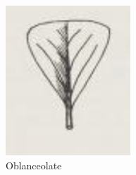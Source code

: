 \documentclass[12pt,english]{article}
\begin{document}
\begin{figure}[!hbt]
\begin{centre}
\begin{minipage}{0.19\textwidth}
		\includegraphics[width=\textwidth]{../code/contour/original/obdeltoid}
	\end{minipage}
	\begin{minipage}{0.19\textwidth}
		\caption{Oblanceolate}

\end{minipage}
\end{centre}
\end{figure}
\end{document}
